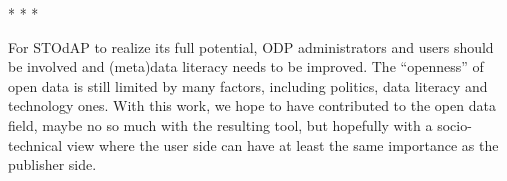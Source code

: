 \vspace{1cm}
\begin{center}* * *
\end{center}
\vspace{1cm}

For STOdAP to realize its full potential, ODP administrators and users should be involved and (meta)data literacy needs to be improved.	
The ``openness'' of open data is still limited by many factors, including politics, data literacy and technology ones.
With this work, we hope to have contributed to the open data field, maybe no so much with the resulting tool, but hopefully with a socio-technical view where the user side can have at least the same importance as the publisher side.